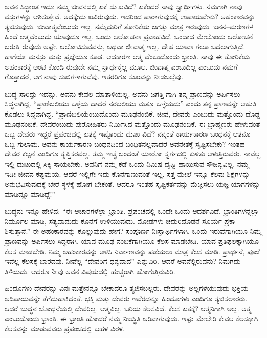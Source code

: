 ಅವನ ಸಿದ್ಧಾಂತ ಇದು: ನಮ್ಮ ಜೀವನದಲ್ಲಿ ಏಕೆ ದುಃಖವಿದೆ? ಏಕೆಂದರೆ ನಾವು ಸ್ವಾರ್ಥಿಗಳು. ನಮಗಾಗಿ ನಾವು ವಸ್ತುಗಳನ್ನು ಆಶಿಸುತ್ತೇವೆ. ಅದಕ್ಕೇದುಃಖವಿರುವುದು. ಇದರಿಂದ ಪಾರಾಗುವುದಕ್ಕೆ ಉಪಾಯವೇನು? ಅಹಂಕಾರವನ್ನು ತ್ಯಜಿಸುವುದು. ಜೀವಾತ್ಮವೆಂಬುದು ಇಲ್ಲ. ನಮ್ಮೆದುರಿಗೆ ತೋರಿಕೆಯ ಜಗತ್ತು ಮಾತ್ರ ಇರುವುದು. ಜನನ–ಮರಣಗಳ ಹಿಂದೆ ಆತ್ಮವೆಂಬುದು ಯಾವುದೂ ಇಲ್ಲ. ಒಂದು ಆಲೋಚನಾ ಪ್ರವಾಹವಿದೆ. ಒಂದಾದ ಮೇಲೊಂದು ಆಲೋಚನೆ ಬರುತ್ತಿ ರುವುದು ಅಷ್ಟೇ. ಆಲೋಚಿಸುವವನು, ಅಥವಾ ಜೀವಾತ್ಮ ಇಲ್ಲ. ದೇಹ ಯಾವಾ ಗಲೂ ಬದಲಾಗುತ್ತಿದೆ. ಹಾಗೆಯೇ ಮನಸ್ಸು ಮತ್ತು ಪ್ರಜ್ಞೆಯೂ ಕೂಡ. ಆದಕಾರಣ ಆತ್ಮ ವೆಂಬುದೊಂದು ಭ್ರಾಂತಿ. ನಾವು ಈ ತೋರಿಕೆಯ ಅಹಂಕಾರಕ್ಕೆ ಅಂಟಿ ಕೊಂಡಿ ರುವುದೇ ನಮ್ಮ ಸ್ವಾರ್ಥಕ್ಕೆಲ್ಲ ಮೂಲ. ಜೀವಾತ್ಮ ಎಂಬುದಿಲ್ಲ ಎಂಬುದು ನಮಗೆ ಗೊತ್ತಾದರೆ, ಆಗ ನಾವು ಸುಖಿಗಳಾಗುವೆವು. ಇತರರಿಗೂ ಸುಖವನ್ನು ನೀಡಬಲ್ಲೆವು.

ಬುದ್ಧ ಸಾರಿದ್ದು ಇದನ್ನು. ಅವನು ಕೇವಲ ಮಾತಾಳಿಯಲ್ಲ. ಅವನು ಜಗತ್ತಿ ಗಾಗಿ ತನ್ನ ಪ್ರಾಣವನ್ನು ಅರ್ಪಿಸಲು ಸಿದ್ಧನಾಗಿದ್ದ. “ಪ್ರಾಣಿಬಲಿಯು ಒಳ್ಳೆಯ ದಾದರೆ ನರಬಲಿಯು ಮತ್ತೂ ಒಳ್ಳೆಯದು” ಎಂದು ತನ್ನ ಪ್ರಾಣವನ್ನೇ ಆಹುತಿ ಕೊಡಲು ಸಿದ್ಧನಾಗಿದ್ದ. “ಪ್ರಾಣಿಬಲಿಯೆಂಬುದೊಂದು ಮೂಢನಂಬಿಕೆ. ಜೀವ, ದೇವರು ಎಂಬುದು ಮತ್ತೊಂದು ದೊಡ್ಡ ಮೂಢನಂಬಿಕೆ. ದೇವರೆಂಬುದು ಪುರೋಹಿತರು ನಿರ್ಮಿಸಿದ ಮತ್ತೊಂದು ಮೂಢನಂಬಿಕೆ. ಈ ಬ್ರಾಹ್ಮಣರು ಹೇಳುವಂತೆ ಒಬ್ಬ ದೇವರು ಇದ್ದರೆ ಪ್ರಪಂಚದಲ್ಲಿ ಏತಕ್ಕೆ ಇಷ್ಟೊಂದು ದುಃಖ ವಿದೆ? ನನ್ನಂತೆ ಕಾರ್ಯಕಾರಣ ಬಂಧನಕ್ಕೆ ಆತನೂ ಒಬ್ಬ ಗುಲಾಮ. ಅವನು ಕಾರ್ಯಕಾರಣ ಬಂಧನದಿಂದ ಬಂಧಿತನಲ್ಲವಾದರೆ ಅವನೇತಕ್ಕೆ ಸೃಷ್ಟಿಸಬೇಕು? ಇಂತಹ ದೇವರ ಕಲ್ಪನೆ ಎಂದಿಗೂ ತೃಪ್ತಿಕರವಲ್ಲ. ತಮ್ಮ ಇಚ್ಛೆ ಬಂದಂತೆ ಯಾರೋ ಸ್ವರ್ಗದಲ್ಲಿ ಕುಳಿತು ಆಳುತ್ತಿರುವರು. ನಾವೆಲ್ಲ ಇಲ್ಲಿ ದುಃಖದಲ್ಲಿ ಸಿಕ್ಕಿ ಸಾಯಬೇಕು. ಅವನಿಗೆ ನಮ್ಮ ಕಡೆ ಒಂದು ನಿಮಿಷ ದೃಷ್ಟಿ ಹಾಯಿಸುವ ಸೌಜನ್ಯವಿಲ್ಲ. ನಮ್ಮ ಇಡೀ ಜೀವನ ಕಷ್ಟಮಯ. ಆದರೆ ಇಲ್ಲಿಗೇ ಇದು ಕೊನೆಗಾಣುವಂತೆ ಇಲ್ಲ. ಸತ್ತ ಮೇಲೆ ಇನ್ನೂ ಕೆಲವು ಶಿಕ್ಷೆಗಳನ್ನು ಅನುಭವಿಸುವುದಕ್ಕೆ ಬೇರೆ ಸ್ಥಳಕ್ಕೆ ಹೋಗ ಬೇಕಂತೆ. ಆದರೂ ಇಂತಹ ಸೃಷ್ಟಿಕರ್ತನನ್ನು ಮೆಚ್ಚಿಸಲು ಯಜ್ಞ ಯಾಗಗಳನ್ನು ಮಾಡಿದ್ದೂ ಮಾಡಿದ್ದೆ!”

ಬುದ್ಧನು ಇನ್ನೂ ಹೇಳಿದ: “ಈ ಆಚಾರಗಳೆಲ್ಲಾ ಭ್ರಾಂತಿ. ಪ್ರಪಂಚದಲ್ಲಿ ಒಂದೇ ಒಂದು ಆದರ್ಶವಿದೆ. ಭ್ರಾಂತಿಗಳನ್ನೆಲ್ಲಾ ನಿರ್ಮೂಲ ಮಾಡಿ, ಸತ್ಯವಾದುದು ಕೊನೆಗೆ ಉಳಿಯುವುದು. ಮೋಡಗಳು ಚದುರಿದೊಡನೆ ಸೂರ್ಯ ಪ್ರಕಾ ಶಿಸುತ್ತಾನೆ.” ಈ ಅಹಂಕಾರವನ್ನು ಕೊಲ್ಲುವುದು ಹೇಗೆ? ಸಂಪೂರ್ಣ ನಿಃಸ್ವಾರ್ಥಿಗಳಾಗಿ, ಒಂದು ಇರುವೆಗಾಗಿಯೂ ನಿಮ್ಮ ಪ್ರಾಣವನ್ನು ಅರ್ಪಿಸಲು ಸಿದ್ಧರಾಗಿ. ಯಾವ ಮೂಢ ನಂಬಿಕೆಗಾಗಿಯೂ ಕೆಲಸ ಮಾಡಬೇಡಿ. ಯಾವ ಪ್ರತಿಫಲಕ್ಕಾಗಿಯೂ ಕೆಲಸ ಮಾಡಬೇಡಿ. ನಿಮ್ಮ ಅಹಂಕಾರವನ್ನು ಅಳಿಸಿ ನಿರ್ವಾಣವನ್ನು ಪಡೆಯಲು ಮಾತ್ರ ಕೆಲಸ ಮಾಡಿ. ಪ್ರಾರ್ಥನೆ, ಪೂಜೆ ಇವೆಲ್ಲ ಕೆಲಸಕ್ಕೆ ಬಾರದವು. ನೀವೆಲ್ಲ “ದೇವರಿಗೆ ಧನ್ಯವಾದ” ಎನ್ನುವಿರಿ. ಆದರೆ ಅವನೆಲ್ಲಿರುವನು? ನಿಮಗದು ತಿಳಿಯದು. ಆದರೂ ನೀವು ಅವನ ವಿಷಯದಲ್ಲಿ ಹುಚ್ಚರಾಗಿ ಹೋಗುತ್ತಿರುವಿರಿ.

ಹಿಂದೂಗಳು ದೇವರನ್ನು ವಿನಃ ಮತ್ತೇನನ್ನೂ ಬೇಕಾದರೂ ತ್ಯಜಿಸಬಲ್ಲರು. ದೇವರನ್ನು ಅಲ್ಲಗಳೆಯುವುದು ಭಕ್ತಿಯ ಅಡಿಪಾಯವನ್ನೇ ತೆಗೆದುಹಾಕಿದಂತೆ. ಭಕ್ತಿ ಮತ್ತು ದೇವರು ಇವೆರಡನ್ನೂ ಹಿಂದೂಗಳು ಎಂದಿಗೂ ತ್ಯಜಿಸಲಾರರು. ಆದರೆ ಬುದ್ಧನ ಬೋಧನೆಯಲ್ಲಿ ದೇವರಿಲ್ಲ. ಆತ್ಮವಿಲ್ಲ. ಬರಿಯ ಕೆಲಸವಿದೆ. ಕೆಲಸ ಏತಕ್ಕೆ? ಆತ್ಮನಿಗಾಗಿ ಅಲ್ಲ. ಆತ್ಮ ಎಂಬುದೊಂದು ಭ್ರಾಂತಿ. ಈ ಭ್ರಾಂತಿ ಹೋದರೆ ನಮ್ಮ ನಿಜಸ್ಥಿತಿ ಅರಿವಾಗುವುದು. ಇಷ್ಟು ಮೇಲೇರಿ ಕೇವಲ ಕೆಲಸಕ್ಕಾಗಿ ಕೆಲಸವನ್ನು ಮಾಡುವವರು ಪ್ರಪಂಚದಲ್ಲಿ ಬಹಳ ವಿರಳ.

